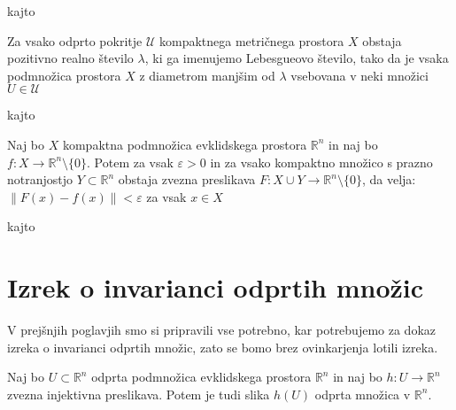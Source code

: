 \documentclass[mat1]{fmfdelo}
\newcommand{\R}{\mathbb R}
\newcommand{\0}{\underline{0}}
\begin{document}
\begin{dokaz}
kajto
\end{dokaz}

\begin{lema}\label{lem:lebesgue}
Za vsako odprto pokritje $\mathcal{U}$ kompaktnega metričnega prostora $X$ obstaja pozitivno realno število $\lambda$, ki ga imenujemo Lebesgueovo število, tako da je vsaka podmnožica prostora $X$ z diametrom manjšim od $\lambda$ vsebovana v neki množici $U \in \mathcal{U}$
\end{lema}

\begin{dokaz}
kajto
\end{dokaz}


\begin{lema}\label{lem:razsiritev-nic}
Naj bo $X$ kompaktna podmnožica evklidskega prostora $\R^n$ in naj bo \mbox{$f : X \to \R^n \setminus \{0\}$}. Potem za vsak $\varepsilon > 0$ in za vsako kompaktno množico s prazno notranjostjo $Y \subset \R^n$ obstaja zvezna preslikava $F : X \cup Y \to \R^n \setminus \{0\}$, da velja: $\| F(x)-f(x) \| < \varepsilon$  za vsak $x \in X$
\end{lema}

\begin{dokaz}
kajto
\end{dokaz}

\section{Izrek o invarianci odprtih množic}
V prejšnjih poglavjih smo si pripravili vse potrebno, kar potrebujemo za dokaz izreka o invarianci odprtih množic, zato se bomo brez ovinkarjenja lotili izreka.



\begin{izrek}\label{main_theorem}
Naj bo $U \subset \R^n$ odprta podmnožica evklidskega prostora $\R^n$ in naj bo $h : U \rightarrow \R^n$ zvezna injektivna preslikava.
Potem je tudi slika $h(U)$ odprta množica v $\R^n$.
\end{izrek}
\end{document}
